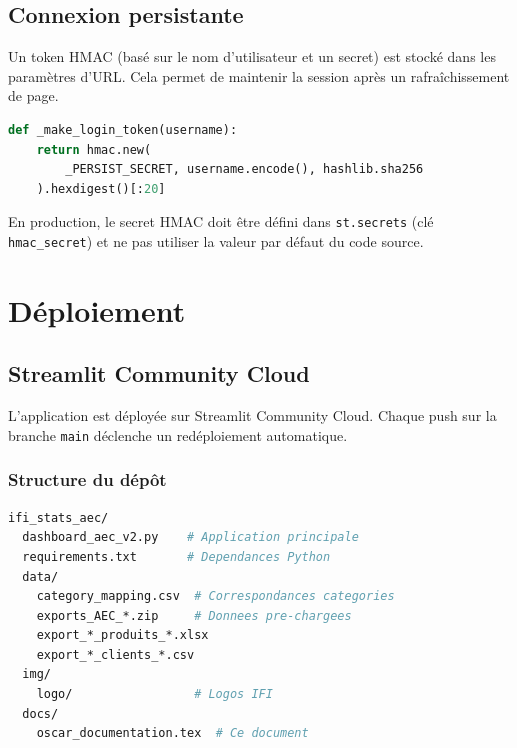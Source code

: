 \documentclass[12pt,a4paper,twoside]{article}
\begin{document}
\subsection{Connexion persistante}

Un token HMAC (bas\'{e} sur le nom d'utilisateur et un secret) est stock\'{e} dans les param\`{e}tres d'URL. Cela permet de maintenir la session apr\`{e}s un rafra\^{i}chissement de page.

\begin{lstlisting}[language=Python, caption={G\'{e}n\'{e}ration du token HMAC}]
def _make_login_token(username):
    return hmac.new(
        _PERSIST_SECRET, username.encode(), hashlib.sha256
    ).hexdigest()[:20]
\end{lstlisting}

\begin{warnbox}[Important]
En production, le secret HMAC doit \^{e}tre d\'{e}fini dans \texttt{st.secrets} (cl\'{e} \texttt{hmac\_secret}) et ne pas utiliser la valeur par d\'{e}faut du code source.
\end{warnbox}

\section{D\'{e}ploiement}

\subsection{Streamlit Community Cloud}

L'application est d\'{e}ploy\'{e}e sur Streamlit Community Cloud. Chaque push sur la branche \texttt{main} d\'{e}clenche un red\'{e}ploiement automatique.

\subsubsection{Structure du d\'{e}p\^{o}t}

\begin{lstlisting}[language=bash, caption={Arborescence du d\'{e}p\^{o}t}]
ifi_stats_aec/
  dashboard_aec_v2.py    # Application principale
  requirements.txt       # Dependances Python
  data/
    category_mapping.csv  # Correspondances categories
    exports_AEC_*.zip     # Donnees pre-chargees
    export_*_produits_*.xlsx
    export_*_clients_*.csv
  img/
    logo/                 # Logos IFI
  docs/
    oscar_documentation.tex  # Ce document
\end{lstlisting}
\end{document}
